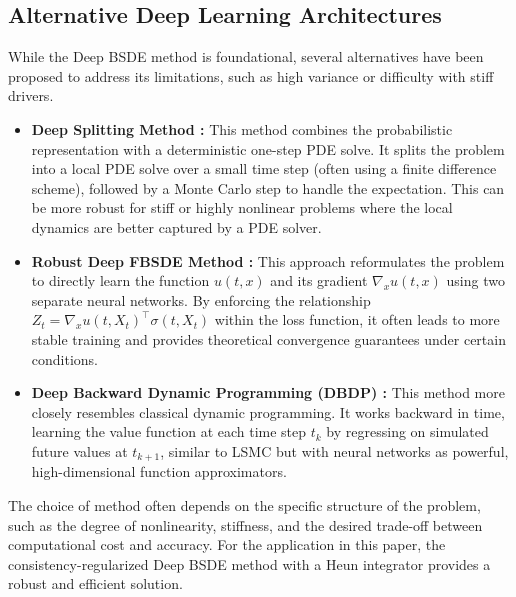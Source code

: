 \documentclass[11pt,letterpaper,oneside]{article}
\theoremstyle{plain}
\theoremstyle{definition}
\theoremstyle{remark}
\begin{document}
\subsection{Alternative Deep Learning Architectures}
While the Deep BSDE method is foundational, several alternatives have been proposed to address its limitations, such as high variance or difficulty with stiff drivers.
\begin{itemize}
    \item \textbf{Deep Splitting Method \cite{Beck2019}:} This method combines the probabilistic representation with a deterministic one-step PDE solve. It splits the problem into a local PDE solve over a small time step (often using a finite difference scheme), followed by a Monte Carlo step to handle the expectation. This can be more robust for stiff or highly nonlinear problems where the local dynamics are better captured by a PDE solver.
    \item \textbf{Robust Deep FBSDE Method \cite{Goudenegge2020}:} This approach reformulates the problem to directly learn the function $u(t,x)$ and its gradient \(\nabla_x u(t,x)\) using two separate neural networks. By enforcing the relationship \(Z_t = \nabla_x u(t,X_t)^\top \sigma(t,X_t)\) within the loss function, it often leads to more stable training and provides theoretical convergence guarantees under certain conditions.
    \item \textbf{Deep Backward Dynamic Programming (DBDP) \cite{Hure2020}:} This method more closely resembles classical dynamic programming. It works backward in time, learning the value function at each time step \(t_k\) by regressing on simulated future values at \(t_{k+1}\), similar to LSMC but with neural networks as powerful, high-dimensional function approximators.
\end{itemize}
The choice of method often depends on the specific structure of the problem, such as the degree of nonlinearity, stiffness, and the desired trade-off between computational cost and accuracy. For the application in this paper, the consistency-regularized Deep BSDE method with a Heun integrator provides a robust and efficient solution.
\end{document}
